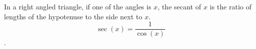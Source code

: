 
In a right angled triangle, if one of the angles is $x$, the secant of $x$ is the ratio of lengths of the hypotenuse to the side next to $x$. 
$$\sec(x) = \frac{1}{\cos(x)}$$.

  
  